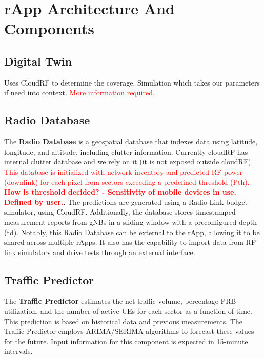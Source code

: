 \section{rApp Architecture And Components}
\label{sec:arch}

\subsection{Digital Twin}

Uses CloudRF to determine the coverage. Simulation which takes our parameters if need into context. \textcolor{red}{More information required.} \\

\subsection{Radio Database}

The \textbf{Radio Database} is a geospatial database that indexes data using latitude, longitude, and altitude, including clutter information. Currently cloudRF has internal clutter database and we rely on it (it is not exposed outside cloudRF). \textcolor{red}{This database is initialized with network inventory and predicted RF power (downlink) for each pixel from sectors exceeding a predefined threshold (Pth). \textbf{How is threshold decided? - Sensitivity of mobile devices in use. Defined by user.}}. The predictions are generated using a Radio Link budget simulator, using CloudRF. Additionally, the database stores timestamped measurement reports from gNBs in a sliding window with a preconfigured depth (td). Notably, this Radio Database can be external to the rApp, allowing it to be shared across multiple rApps. It also has the capability to import data from RF link simulators and drive tests through an external interface. \\

\subsection{Traffic Predictor}

The \textbf{Traffic Predictor} estimates the net traffic volume, percentage PRB utilization, and the number of active UEs for each sector as a function of time. This prediction is based on historical data and previous measurements. The Traffic Predictor employs ARIMA/SERIMA algorithms to forecast these values for the future. Input information for this component is expected in 15-minute intervals. \\


